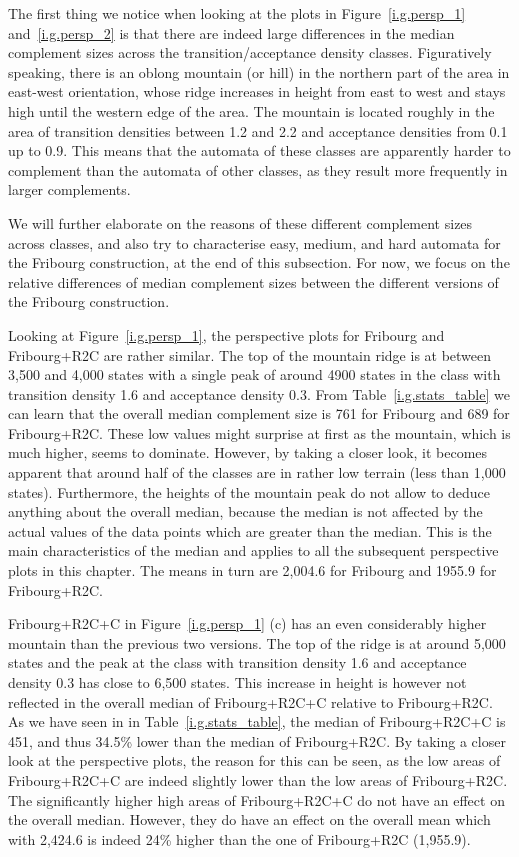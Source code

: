 The first thing we notice when looking at the plots in Figure~\ref{i.g.persp_1} and~\ref{i.g.persp_2} is that there are indeed large differences in the median complement sizes across the transition/acceptance density classes. Figuratively speaking, there is an oblong mountain (or hill) in the northern part of the area in east-west orientation, whose ridge increases in height from east to west and stays high until the western edge of the area. The mountain is located roughly in the area of transition densities between 1.2 and 2.2 and acceptance densities from 0.1 up to 0.9. This means that the automata of these classes are apparently harder to complement than the automata of other classes, as they result more frequently in larger complements.

We will further elaborate on the reasons of these different complement sizes across classes, and also try to characterise easy, medium, and hard automata for the Fribourg construction, at the end of this subsection. For now, we focus on the relative differences of median complement sizes between the different versions of the Fribourg construction.

Looking at Figure~\ref{i.g.persp_1}, the perspective plots for Fribourg and Fribourg+R2C are rather similar. The top of the mountain ridge is at between 3,500 and 4,000 states with a single peak of around 4900 states in the class with transition density 1.6 and acceptance density 0.3. From Table~\ref{i.g.stats_table} we can learn that the overall median complement size is 761 for Fribourg and 689 for Fribourg+R2C. These low values might surprise at first as the mountain, which is much higher, seems to dominate. However, by taking a closer look, it becomes apparent that around half of the classes are in rather low terrain (less than 1,000 states). Furthermore, the heights of the mountain peak do not allow to deduce anything about the overall median, because the median is not affected by the actual values of the data points which are greater than the median. This is the main characteristics of the median and applies to all the subsequent perspective plots in this chapter. The means in turn are 2,004.6 for Fribourg and 1955.9 for Fribourg+R2C.

Fribourg+R2C+C in Figure~\ref{i.g.persp_1} (c) has an even considerably higher mountain than the previous two versions. The top of the ridge is at around 5,000 states and the peak at the class with transition density 1.6 and acceptance density 0.3 has close to 6,500 states. This increase in height is however not reflected in the overall median of Fribourg+R2C+C relative to Fribourg+R2C. As we have seen in in Table~\ref{i.g.stats_table}, the median of Fribourg+R2C+C is 451, and thus 34.5\% lower than the median of Fribourg+R2C. By taking a closer look at the perspective plots, the reason for this can be seen, as the low areas of Fribourg+R2C+C are indeed slightly lower than the low areas of Fribourg+R2C. The significantly higher high areas of Fribourg+R2C+C do not have an effect on the overall median. However, they do have an effect on the overall mean which with 2,424.6 is indeed 24\% higher than the one of Fribourg+R2C (1,955.9).

